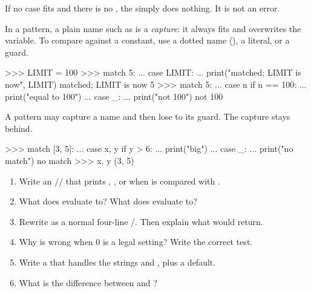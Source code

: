 If no case fits and there is no , the  simply does nothing. It is not an
error.

\begin{trap}
In a pattern, a plain name such as  is a \emph{capture}: it always fits and overwrites the
variable. To compare against a constant, use a dotted name (), a literal, or a guard.
\end{trap}

\begin{pycode}
>>> LIMIT = 100
>>> match 5:
...     case LIMIT:
...         print("matched; LIMIT is now", LIMIT)
matched; LIMIT is now 5
>>> match 5:
...     case n if n == 100:
...         print("equal to 100")
...     case _:
...         print("not 100")
not 100
\end{pycode}

\begin{trap}
A pattern may capture a name and then lose to its guard. The capture stays behind.
\end{trap}

\begin{pycode}
>>> match [3, 5]:
...     case x, y if y > 6:
...         print("big")
...     case _:
...         print("no match")
no match
>>> x, y
(3, 5)
\end{pycode}

\begin{practice}
\begin{enumerate}
\item Write an // that prints , , or
 when  is compared with .
\item What does  evaluate to? What does  evaluate to?
\item Rewrite  as a normal four-line /.
Then explain what  would return.
\item Why is  wrong when 0 is a legal setting? Write the correct test.
\item Write a  that handles the strings  and , plus a default.
\item What is the difference between  and ?
\end{enumerate}
\end{practice}

